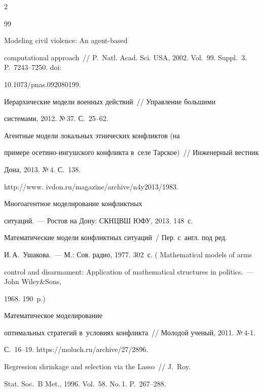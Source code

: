 \begin{multicols}{2}
{{\begin{thebibliography}{99}

 Modeling civil violence: An agent-based 

computational approach~// P.~Natl. Acad. Sci. USA, 2002. Vol.~99. Suppl.~3. P.~7243--7250. doi: 

10.1073/pnas.092080199.


 Иерархические модели военных действий~// Управление большими 

системами, 2012. №\,37. С.~25--62.


 Агентные модели локальных этнических конфликтов (на 

примере осе\-ти\-но-ин\-гуш\-ско\-го конфликта в~селе Тарское)~// Инженерный вестник 

Дона, 2013. №\,4.  С.~138.

{\sf http://www. ivdon.ru/magazine/archive/n4y2013/1983}.




 Многоагентное моделирование конфликтных  

ситуаций.~--- Ростов на Дону: СКНЦВШ ЮФУ, 2013. 148~с.


 Математические модели конфликтных ситуаций~/ Пер. с~англ. под ред. 

И.\,А.~Ушакова.~--- М.: Сов. радио, 1977. 302~с. ( Mathematical models of arms 

control and disarmament: Application of mathematical structures in politics.~--- John Wiley\&Sons, 

1968. 190~p.)


 Математическое моделирование 

оптимальных стратегий в~условиях конфликта~// Молодой ученый, 2011.  \mbox{№\,4-1}.  

С.~16--19. {\sf https://moluch.ru/archive/27/2896.}


 Regression shrinkage and selection via the Lasso~// J.~Roy. 

Stat. Soc.~B Met., 1996. Vol.~58. No.\,1. P.~267--288.


\end{thebibliography}}}
\end{multicols}
